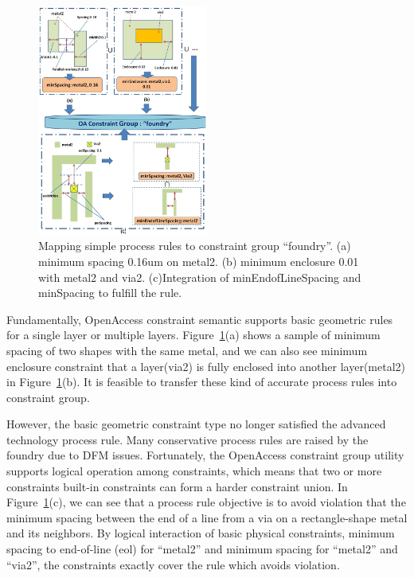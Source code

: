   
  \begin{figure}[t]
    \centering
    \includegraphics[width=0.5\textwidth]{Fig/CG/SimpleRuleCon2.eps}
    \caption{Mapping simple process rules to constraint group ``foundry''. (a) minimum spacing 0.16um on metal2. (b) minimum enclosure 0.01 with metal2 and via2. (c)Integration of minEndofLineSpacing and minSpacing to fulfill the rule.}
    \label{fig:SimruleCon}
  \end{figure}
  
  Fundamentally, OpenAccess constraint semantic supports basic geometric rules for a single layer or multiple layers. Figure~\ref{fig:SimruleCon}(a) shows a sample of minimum spacing of two shapes with the same metal, and we can also see minimum enclosure constraint that a layer(via2) is fully enclosed into another layer(metal2) in Figure~\ref{fig:SimruleCon}(b). It is feasible to transfer these kind of accurate process rules into constraint group.

  However, the basic geometric constraint type no longer satisfied the advanced technology process rule. Many conservative process rules are raised by the foundry due to DFM issues. Fortunately, the OpenAccess constraint group utility supports logical operation among constraints, which means that two or more constraints built-in constraints can form a harder constraint union. In Figure~\ref{fig:SimruleCon}(c), we can see that a process rule objective is to avoid violation that the minimum spacing between the end of a line from a via on a rectangle-shape metal and its neighbors. By logical interaction of basic physical constraints, minimum spacing to end-of-line (eol) for ``metal2'' and minimum spacing for ``metal2'' and ``via2'', the constraints exactly cover the rule which avoids violation.
  
